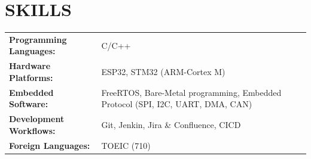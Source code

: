 \documentclass[a4paper,11pt]{article}
\begin{document}

\section{SKILLS}

\begin{tabularx}{\linewidth}{@{}l X@{}}
\textbf{Programming Languages:} & C/C++ \\[2pt]
\textbf{Hardware Platforms:} & ESP32, STM32 (ARM-Cortex M) \\[2pt]
\textbf{Embedded Software:} & FreeRTOS, Bare-Metal programming, Embedded Protocol (SPI, I2C, UART, DMA, CAN) \\[2pt]
\textbf{Development Workflows:} & Git, Jenkin, Jira \& Confluence, CICD\\[2pt]
\textbf{Foreign Languages:} & TOEIC (710) \\
\end{tabularx}

\vfill
\end{document}
